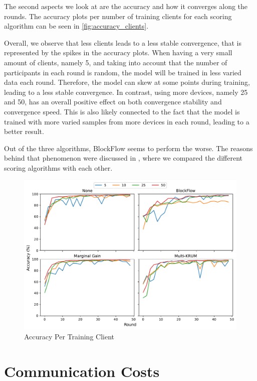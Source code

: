The second aspects we look at are the accuracy and how it converges along the rounds. The accuracy plots per number of training clients for each scoring algorithm can be seen in \autoref{fig:accuracy_clients}.

Overall, we observe that less clients leads to a less stable convergence, that is represented by the spikes in the accuracy plots. When having a very small amount of clients, namely 5, and taking into account that the number of participants in each round is random, the model will be trained in less varied data each round. Therefore, the model can skew at some points during training, leading to a less stable convergence. In contrast, using more devices, namely 25 and 50, has an overall positive effect on both convergence stability and convergence speed. This is also likely connected to the fact that the model is trained with more varied samples from more devices in each round, leading to a better result.

Out of the three algorithms, BlockFlow seems to perform the worse. The reasons behind that phenomenon were discussed in , where we compared the different scoring algorithms with each other.

\begin{figure}[!ht]
    \centering
    \includegraphics[width=\textwidth]{graphics/clients/accuracy.pdf}
    \caption{Accuracy Per Training Client}
    \label{fig:accuracy_clients}
\end{figure}

\section{Communication Costs}

